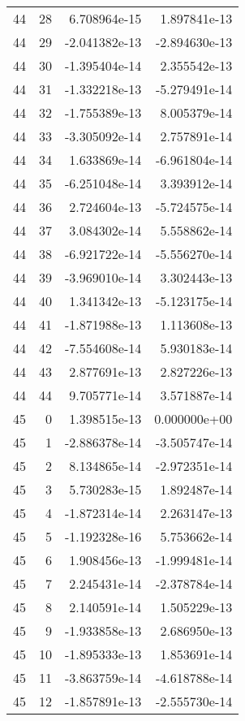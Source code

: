 \begin{tabular}{rrrr}
  44 &   28 &  6.708964e-15 &  1.897841e-13 \\
  44 &   29 & -2.041382e-13 & -2.894630e-13 \\
  44 &   30 & -1.395404e-14 &  2.355542e-13 \\
  44 &   31 & -1.332218e-13 & -5.279491e-14 \\
  44 &   32 & -1.755389e-13 &  8.005379e-14 \\
  44 &   33 & -3.305092e-14 &  2.757891e-14 \\
  44 &   34 &  1.633869e-14 & -6.961804e-14 \\
  44 &   35 & -6.251048e-14 &  3.393912e-14 \\
  44 &   36 &  2.724604e-13 & -5.724575e-14 \\
  44 &   37 &  3.084302e-14 &  5.558862e-14 \\
  44 &   38 & -6.921722e-14 & -5.556270e-14 \\
  44 &   39 & -3.969010e-14 &  3.302443e-13 \\
  44 &   40 &  1.341342e-13 & -5.123175e-14 \\
  44 &   41 & -1.871988e-13 &  1.113608e-13 \\
  44 &   42 & -7.554608e-14 &  5.930183e-14 \\
  44 &   43 &  2.877691e-13 &  2.827226e-13 \\
  44 &   44 &  9.705771e-14 &  3.571887e-14 \\
  45 &    0 &  1.398515e-13 &  0.000000e+00 \\
  45 &    1 & -2.886378e-14 & -3.505747e-14 \\
  45 &    2 &  8.134865e-14 & -2.972351e-14 \\
  45 &    3 &  5.730283e-15 &  1.892487e-14 \\
  45 &    4 & -1.872314e-14 &  2.263147e-13 \\
  45 &    5 & -1.192328e-16 &  5.753662e-14 \\
  45 &    6 &  1.908456e-13 & -1.999481e-14 \\
  45 &    7 &  2.245431e-14 & -2.378784e-14 \\
  45 &    8 &  2.140591e-14 &  1.505229e-13 \\
  45 &    9 & -1.933858e-13 &  2.686950e-13 \\
  45 &   10 & -1.895333e-13 &  1.853691e-14 \\
  45 &   11 & -3.863759e-14 & -4.618788e-14 \\
  45 &   12 & -1.857891e-13 & -2.555730e-14 \\

\end{tabular}
